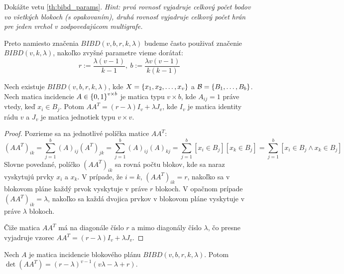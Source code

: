\begin{exercise}
Dokážte vetu \ref{th:bibd_params}. \emph{Hint: prvá rovnosť vyjadruje celkový počet bodov vo všetkých blokoch (s opakovaním), druhá rovnosť vyjadruje celkový počet hrán pre jeden vrchol v zodpovedajúcom multigrafe.}
\end{exercise}

\begin{corollary}
Preto namiesto značenia $BIBD(v, b, r, k, \lambda)$ budeme často
použivať značenie $BIBD(v, k, \lambda)$, nakoľko 
zvyšné parametre vieme dorátať: 
$$r := \dfrac{\lambda (v-1)}{k-1},~ b := \dfrac{\lambda v (v-1)}{k (k-1)}$$
\end{corollary}

\begin{theorem}

Nech existuje $BIBD(v, b,r, k, \lambda)$, kde $X = \left\{x_1, x_2, \ldots, x_v\right\}$ a $\mathcal{B} = \left\{B_1, \ldots, B_b\right\}$. 
Nech matica incidencie $A \in \left\{0, 1\right\}^{v \times b}$ je matica typu $v\times b$, kde $A_{ij} = 1$ práve vtedy, keď $x_i \in B_j$.
Potom $A A^T = (r-\lambda) I_v + \lambda J_{v}$, kde $I_v$ je matica identity rádu $v$ a $J_v$ je matica jednotiek typu $v \times v$.
\end{theorem}

\begin{proof}
Pozrieme sa na jednotlivé políčka matice $A A^T$:
\begin{equation*}
(AA^T)_{ik} = \sum_{j=1}^b (A)_{ij} (A^T)_{jk} = \sum_{j=1}^b (A)_{ij} (A)_{kj} = \sum_{j=1}^b [x_i \in B_j] [x_k \in B_j] = \sum_{j=1}^b [x_i \in B_j \wedge x_k \in B_j]
\end{equation*}
Slovne povedané, políčko $(AA^T)_{ik}$ sa rovná počtu blokov, kde sa naraz vyskytujú prvky $x_i$ a $x_k$.
V prípade, že $i = k$, $(AA^T)_{ik} = r$, nakoľko sa v blokovom pláne každý prvok vyskytuje v práve $r$ blokoch.
V opačnom prípade $(AA^T)_{ik} = \lambda$, nakoľko sa každá dvojica prvkov v blokovom pláne vyskytuje v práve $\lambda$ blokoch.

Čiže matica $AA^T$ má na diagonále číslo $r$ a mimo diagonály číslo $\lambda$, čo presne vyjadruje vzorec $A A^T = (r-\lambda) I_v + \lambda J_{v}$. 
\end{proof}


\begin{lemma}
\label{lem:aat_det}
Nech $A$ je matica incidencie blokového plánu $BIBD(v, b,r, k, \lambda)$. Potom $\det(AA^T) = (r-\lambda)^{v-1} (v\lambda - \lambda + r)$.
\end{lemma}

